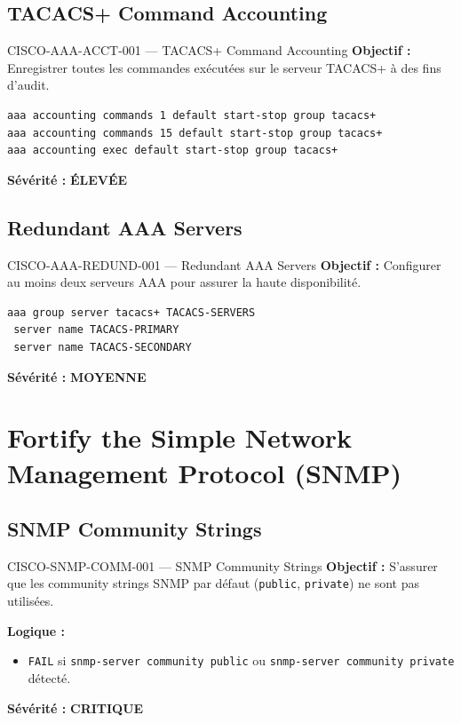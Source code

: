 \documentclass[12pt, a4paper]{report}
\begin{document}
\subsection{TACACS+ Command Accounting}

\begin{rulebox}{CISCO-AAA-ACCT-001 — TACACS+ Command Accounting}
  \textbf{Objectif :} Enregistrer toutes les commandes exécutées sur le serveur TACACS+ à des fins d'audit.

  \begin{lstlisting}
aaa accounting commands 1 default start-stop group tacacs+
aaa accounting commands 15 default start-stop group tacacs+
aaa accounting exec default start-stop group tacacs+
  \end{lstlisting}

  \textbf{Sévérité :} \textcolor{accentOrange}{\textbf{ÉLEVÉE}}
\end{rulebox}

\subsection{Redundant AAA Servers}

\begin{rulebox}{CISCO-AAA-REDUND-001 — Redundant AAA Servers}
  \textbf{Objectif :} Configurer au moins deux serveurs AAA pour assurer la haute disponibilité.

  \begin{lstlisting}
aaa group server tacacs+ TACACS-SERVERS
 server name TACACS-PRIMARY
 server name TACACS-SECONDARY
  \end{lstlisting}

  \textbf{Sévérité :} \textcolor{accentGreen}{\textbf{MOYENNE}}
\end{rulebox}

\section{Fortify the Simple Network Management Protocol (SNMP)}

\subsection{SNMP Community Strings}

\begin{rulebox}{CISCO-SNMP-COMM-001 — SNMP Community Strings}
  \textbf{Objectif :} S'assurer que les community strings SNMP par défaut (\texttt{public}, \texttt{private}) ne sont pas utilisées.

  \textbf{Logique :}
  \begin{itemize}
    \item \texttt{FAIL} si \texttt{snmp-server community public} ou \texttt{snmp-server community private} détecté.
  \end{itemize}

  \textbf{Sévérité :} \textcolor{accentRed}{\textbf{CRITIQUE}}
\end{rulebox}
\end{document}
